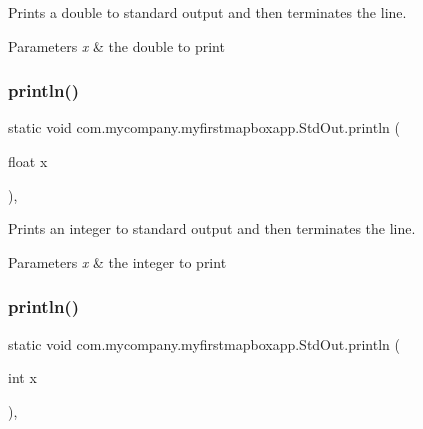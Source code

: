 Prints a double to standard output and then terminates the line.


\begin{DoxyParams}{Parameters}
{\em x} & the double to print \\
\hline
\end{DoxyParams}
\mbox{\label{classcom_1_1mycompany_1_1myfirstmapboxapp_1_1_std_out_ab40370ac41682e06fba46002853bc740}} 
\subsubsection{\texorpdfstring{println()}{println()}\hspace{0.1cm}{\footnotesize\ttfamily [6/10]}}
{\footnotesize\ttfamily static void com.\+mycompany.\+myfirstmapboxapp.\+Std\+Out.\+println (\begin{DoxyParamCaption}\item[{float}]{x }\end{DoxyParamCaption})\hspace{0.3cm}{\ttfamily [inline]}, {\ttfamily [static]}}

Prints an integer to standard output and then terminates the line.


\begin{DoxyParams}{Parameters}
{\em x} & the integer to print \\
\hline
\end{DoxyParams}
\mbox{\label{classcom_1_1mycompany_1_1myfirstmapboxapp_1_1_std_out_a031ff542677ff87baada59e2ee1f6b10}} 
\subsubsection{\texorpdfstring{println()}{println()}\hspace{0.1cm}{\footnotesize\ttfamily [7/10]}}
{\footnotesize\ttfamily static void com.\+mycompany.\+myfirstmapboxapp.\+Std\+Out.\+println (\begin{DoxyParamCaption}\item[{int}]{x }\end{DoxyParamCaption})\hspace{0.3cm}{\ttfamily [inline]}, {\ttfamily [static]}}

